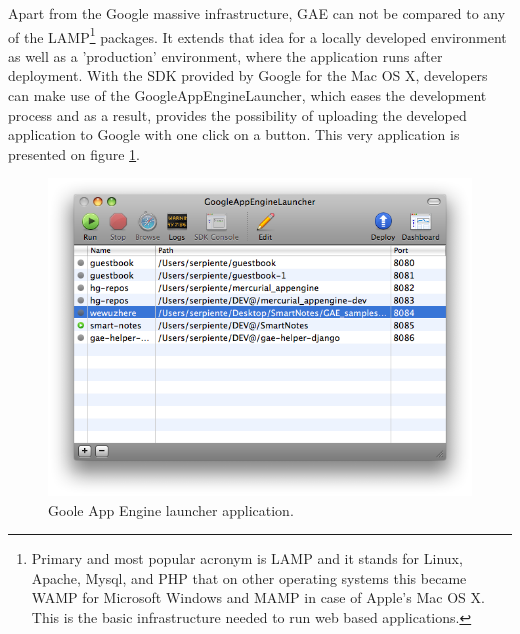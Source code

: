 Apart from the Google massive infrastructure, GAE can not be compared to any of the LAMP\footnote{Primary and most popular acronym is LAMP and it stands for Linux, Apache, Mysql, and PHP that on other operating systems this became WAMP for Microsoft Windows and MAMP in case of Apple's Mac OS X. This is the basic infrastructure needed to run web based applications.} packages. It extends that idea for a locally developed environment as well as a 'production' environment, where the application runs after deployment. With the SDK provided by Google for the Mac OS X, developers can make use of the GoogleAppEngineLauncher, which eases the development process and as a result, provides the possibility of uploading the developed application to Google with one click on a button. This very application is presented on figure \ref{gae_launcher}.
\begin{figure}[h]
\begin{center}
\includegraphics[scale=0.4]{img/gae_launcher.png}
\caption{Goole App Engine launcher application.}
\label{gae_launcher}
\end{center}
\end{figure}

